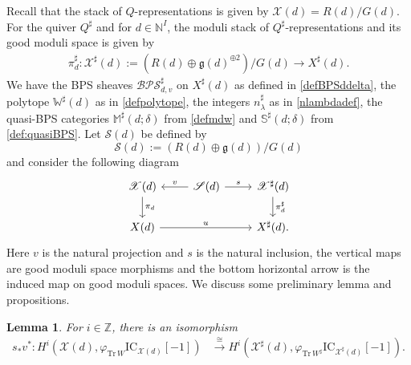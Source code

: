 \documentclass [11pt,oneside,a4paper,mathscr]{amsart}
\newtheorem{lemma}[thm]{Lemma}
\theoremstyle{definition}
\newcommand{\X}{\mathscr{X}}
\begin{document}
    Recall that the stack of $Q$-representations 
    is given by $\X(d)=R(d)/G(d)$.
    For the quiver $Q^\sharp$ and for $d\in \mathbb{N}^I$, 
    the moduli stack of $Q^{\sharp}$-representations 
    and its good moduli space is given by
    \begin{align*}\pi^\sharp_d\colon\X^\sharp(d):=\left(R(d)\oplus \mathfrak{g}(d)^{\oplus 2}\right)/G(d)\to X^\sharp(d).\end{align*}
We have the 
 BPS sheaves $\mathcal{BPS}^\sharp_{d,v}$ on $X^{\sharp}(d)$ as defined in \eqref{defBPSddelta}, 
    the polytope $\mathbb{W}^\sharp(d)$ as in \eqref{defpolytope}, the integers $n^\sharp_\lambda$ as in \eqref{nlambdadef}, the quasi-BPS categories $\mathbb{M}^\sharp(d; \delta)$ from \eqref{defmdw} and  $\mathbb{S}^\sharp(d; \delta)$ from \eqref{def:quasiBPS}. 
Let $\mathscr{S}(d)$ be defined by 
\[\mathscr{S}(d):=(R(d)\oplus \mathfrak{g}(d))/G(d)\] and consider the following 
diagram 
  \begin{equation}\label{diagprop68}
       \begin{tikzcd}
           \X(d)\arrow[d, "\pi_d"] & \mathscr{S}(d)\arrow[r, "s"]\arrow[l, "v"'] & \X^\sharp(d)\arrow[d, "\pi^\sharp_d"]\\
             X(d) \arrow[rr, "u"]& &X^\sharp(d).
         \end{tikzcd}
     \end{equation}
Here $v$ is the natural projection and $s$ is the natural inclusion, 
the vertical maps are good moduli space morphisms and 
the bottom horizontal arrow is the induced map on good moduli spaces. 
We discuss some preliminary lemma and propositions. 



\begin{lemma}\label{lem:BPSprime}
For $i\in\mathbb{Z}$, 
there is an isomorphism
\begin{align}\label{isom:sharp}
    s_*v^*\colon H^i(\X(d), \varphi_{\mathrm{Tr}\,W}\mathrm{IC}_{\X(d)}[-1])&\xrightarrow{\cong} H^i(\X^\sharp(d), \varphi_{\mathrm{Tr}\,W^\sharp}\mathrm{IC}_{\X^\sharp(d)}[-1]).
    \end{align}
   \end{lemma}
\end{document}
